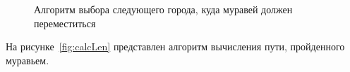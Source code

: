\begin{figure}[h!]
	\caption{Алгоритм выбора следующего города, куда муравей должен переместиться}
	\label{fig:chooseNextLoc}
\end{figure}

\clearpage

На рисунке~\ref{fig:calcLen} представлен алгоритм вычисления пути, пройденного муравьем.

